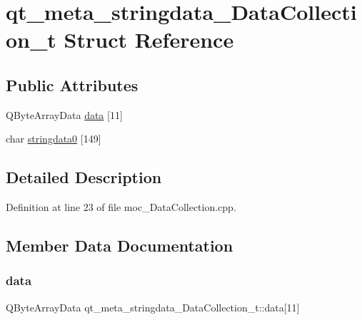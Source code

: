 \hypertarget{structqt__meta__stringdata___data_collection__t}{}\section{qt\+\_\+meta\+\_\+stringdata\+\_\+\+Data\+Collection\+\_\+t Struct Reference}
\label{structqt__meta__stringdata___data_collection__t}
\subsection*{Public Attributes}
\begin{DoxyCompactItemize}
\item 
Q\+Byte\+Array\+Data \hyperlink{structqt__meta__stringdata___data_collection__t_a096c4b6f56eb03a4254068c86bcb95db}{data} \mbox{[}11\mbox{]}
\item 
char \hyperlink{structqt__meta__stringdata___data_collection__t_ac1deb762673d2f438fbbc6bef9ee60d4}{stringdata0} \mbox{[}149\mbox{]}
\end{DoxyCompactItemize}


\subsection{Detailed Description}


Definition at line 23 of file moc\+\_\+\+Data\+Collection.\+cpp.



\subsection{Member Data Documentation}
\mbox{\label{structqt__meta__stringdata___data_collection__t_a096c4b6f56eb03a4254068c86bcb95db}} 
\subsubsection{\texorpdfstring{data}{data}}
{\footnotesize\ttfamily Q\+Byte\+Array\+Data qt\+\_\+meta\+\_\+stringdata\+\_\+\+Data\+Collection\+\_\+t\+::data\mbox{[}11\mbox{]}}



